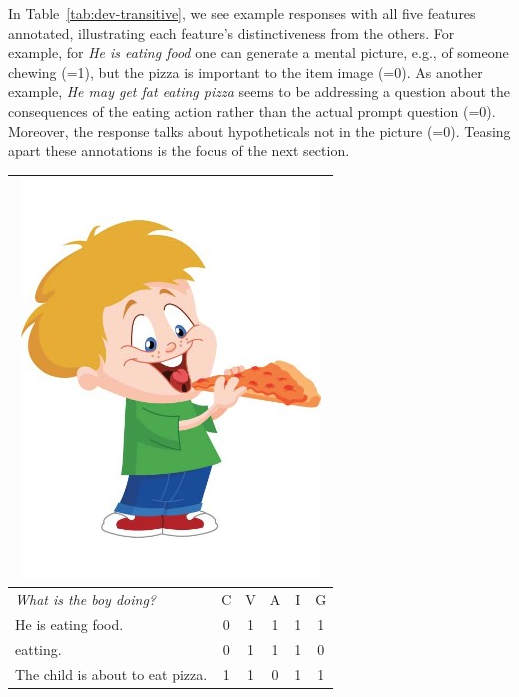 In Table~\ref{tab:dev-transitive}, we see example responses with all five features annotated, illustrating each feature's distinctiveness from the others.  For example, for \textit{He is eating food} one can generate a mental picture, e.g., of someone chewing (=1), but the pizza is important to the item image (=0).  As another example, \textit{He may get fat eating pizza} seems to be addressing a question about the consequences of the eating action rather than the actual prompt question (=0). Moreover, the response talks about hypotheticals not in the picture (=0).
Teasing apart these annotations is the focus of the next section.

\begin{table}[htb!]
\begin{center}
\begin{tabular}{|l|c|c|c|c|c|}
\hline
\multicolumn{6}{|c|}{\includegraphics[width=0.45\columnwidth]{figures/I02.jpg}} \\
\hline
\textit{What is the boy doing?} & C & V & A & I & G \\
\hline
\hline
He is eating food. & 0 & 1 & 1 & 1 & 1 \\
\hline
eatting. & 0 & 1 & 1 & 1 & 0 \\
\hline
The child is about to eat pizza. & 1 & 1 & 0 & 1 & 1 \\

\end{tabular}
\end{center}
\end{table}
